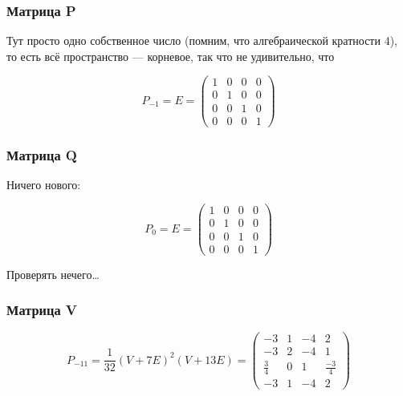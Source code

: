 \documentclass[12pt, a4paper]{article}
\begin{document}
    
    \subsubsection{Матрица P}

    Тут просто одно собственное число (помним, что алгебраической кратности 4), то есть всё пространство — корневое, 
    так что не удивительно, что 

    \begin{equation}
        P_{-1} = E = \left(\begin{matrix}
            1 & 0 & 0 & 0 \\
            0 & 1 & 0 & 0 \\
            0 & 0 & 1 & 0 \\
            0 & 0 & 0 & 1
        \end{matrix}\right)
    \end{equation}


    \subsubsection{Матрица Q}

    Ничего нового:

    \begin{equation}
        P_{0} = E = \left(\begin{matrix}
            1 & 0 & 0 & 0 \\
            0 & 1 & 0 & 0 \\
            0 & 0 & 1 & 0 \\
            0 & 0 & 0 & 1
        \end{matrix}\right)
    \end{equation}

    Проверять нечего…    
    
    \subsubsection{Матрица V}

    \begin{equation}
        P_{-11} = \frac{1}{32} (V + 7E)^2 (V + 13E) = \left(\begin{matrix}
            -3 & 1 & -4 & 2 \\
            -3 & 2 & -4 & 1 \\
            \frac{3}{4} & 0 & 1 & \frac{-3}{4} \\
            -3 & 1 & -4 & 2
        \end{matrix}\right)
    \end{equation}
\end{document}
